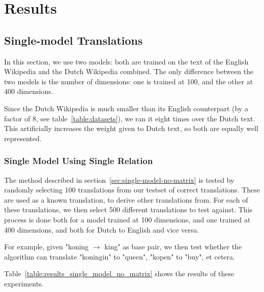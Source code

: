 \section{Results}
\label{sec:results}

\subsection{Single-model Translations}
In this section, we use two models: both are trained on the text of the English Wikipedia and the Dutch Wikipedia combined. The only difference between the two models is the number of dimensions: one is trained at 100, and the other at 400 dimensions.

Since the Dutch Wikipedia is much smaller than its English counterpart (by a factor of 8, see table~\ref{table:datasets}), we ran it eight times over the Dutch text. This artificially increases the weight given to Dutch text, so both are equally well represented.

\subsubsection{Single Model Using Single Relation}
The method described in section~\ref{sec:single-model-no-matrix} is tested by randomly selecting 100 translations from our testset of correct translations. These are used as a known translation, to derive other translations from. For each of these translations, we then select 500 different translations to test against. This process is done both for a model trained at 100 dimensions, and one trained at 400 dimensions, and both for Dutch to English and vice versa.

For example, given "koning $\to$ king" as base pair, we then test whether the algorithm can translate "koningin" to "queen", "kopen" to "buy", et cetera.

Table~\ref{table:results_single_model_no_matrix} shows the results of these experiments.

